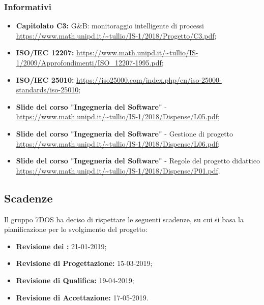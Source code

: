 \subsubsection{Informativi}
\begin{itemize}	
	\item \textbf{Capitolato C3:} G\&B: monitoraggio intelligente di processi 
 \\ \url{https://www.math.unipd.it/~tullio/IS-1/2018/Progetto/C3.pdf};
 	\item \textbf{ISO/IEC 12207:} \url{https://www.math.unipd.it/~tullio/IS-1/2009/Approfondimenti/ISO_12207-1995.pdf};
 	\item \textbf{ISO/IEC 25010:} \url{https://iso25000.com/index.php/en/iso-25000-standards/iso-25010};
 	\item \textbf{Slide del corso "Ingegneria del Software"} - 
 \\ \url{https://www.math.unipd.it/~tullio/IS-1/2018/Dispense/L05.pdf};
	\item \textbf{Slide del corso "Ingegneria del Software"} - Gestione di progetto
 \\ \url{https://www.math.unipd.it/~tullio/IS-1/2018/Dispense/L06.pdf};
 	\item \textbf{Slide del corso "Ingegneria del Software"} - Regole del progetto didattico
 \\ \url{https://www.math.unipd.it/~tullio/IS-1/2018/Dispense/P01.pdf}.
 
\end{itemize}

\subsection{Scadenze}
Il gruppo 7DOS ha deciso di rispettare le seguenti scadenze, su cui si basa la pianificazione per lo svolgimento del progetto:
\begin{itemize}
	\item \textbf{Revisione dei :} 21-01-2019;
	\item \textbf{Revisione di Progettazione:} 15-03-2019;
	\item \textbf{Revisione di Qualifica:} 19-04-2019;
	\item \textbf{Revisione di Accettazione:} 17-05-2019.
\end{itemize}

\pagebreak
